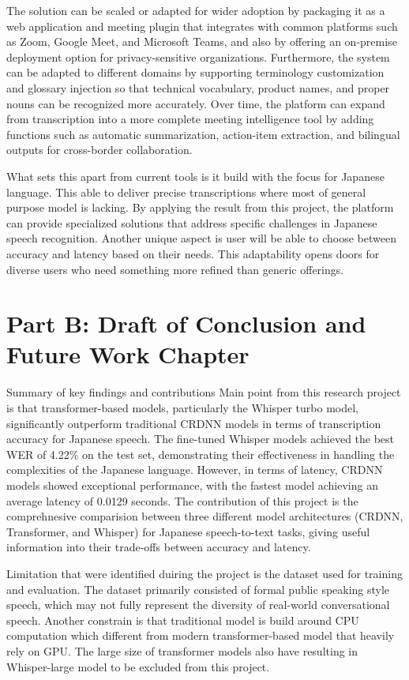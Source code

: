The solution can be scaled or adapted for wider adoption by packaging it as a web application and meeting plugin that integrates with common platforms such as Zoom, Google Meet, and Microsoft Teams, and also by offering an on-premise deployment option for privacy-sensitive organizations. Furthermore, the system can be adapted to different domains by supporting terminology customization and glossary injection so that technical vocabulary, product names, and proper nouns can be recognized more accurately. Over time, the platform can expand from transcription into a more complete meeting intelligence tool by adding functions such as automatic summarization, action-item extraction, and bilingual outputs for cross-border collaboration.


What sets this apart from current tools is it build with the focus for Japanese language. This able to deliver precise transcriptions where most of general purpose model is lacking. By applying the result from this project, the platform can provide specialized solutions that address specific challenges in Japanese speech recognition. Another unique aspect is user will be able to choose between accuracy and latency based on their needs. This adaptability opens doors for diverse users who need something more refined than generic offerings.



\section*{Part B: Draft of Conclusion and Future Work Chapter }
Summary of key findings and contributions
Main point from this research project is that transformer-based models, particularly the Whisper turbo model, significantly outperform traditional CRDNN models in terms of transcription accuracy for Japanese speech. The fine-tuned Whisper models achieved the best WER of 4.22\% on the test set, demonstrating their effectiveness in handling the complexities of the Japanese language. However, in terms of latency, CRDNN models showed exceptional performance, with the fastest model achieving an average latency of 0.0129 seconds. The contribution of this project is the comprehnesive comparision between three different model architectures (CRDNN, Transformer, and Whisper) for Japanese speech-to-text tasks, giving useful information into their trade-offs between accuracy and latency.

Limitation that were identified duiring the project is the dataset used for training and evaluation. The dataset primarily consisted of formal public speaking style speech, which may not fully represent the diversity of real-world conversational speech. Another constrain is that traditional model is build around CPU computation which different from modern transformer-based model that heavily rely on GPU. The large size of transformer models also have resulting in Whisper-large model to be excluded from this project. 

